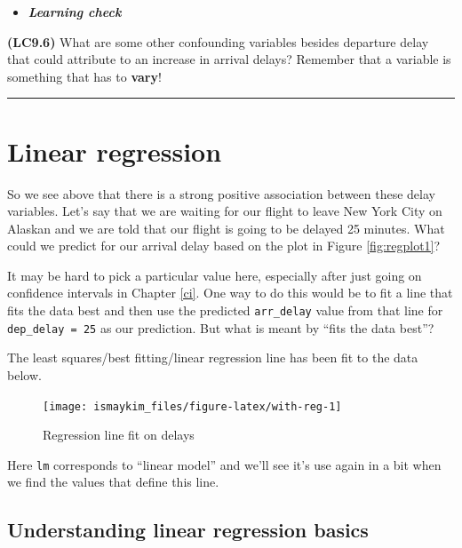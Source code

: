 \documentclass[]{tufte-book}
\let\oldrule=\rule
\renewcommand{\rule}[1]{\oldrule{\linewidth}}
\newenvironment{rmdblock}[1]
  {\begin{shaded*}
  \begin{itemize}
  \renewcommand{\labelitemi}{
    \raisebox{-.7\height}[0pt][0pt]{
    }
  }
  \item
  }
  {
  \end{itemize}
  \end{shaded*}
  }
\newenvironment{learncheck}
  {\begin{rmdblock}{warning}}
  {\end{rmdblock}}
\begin{document}
\begin{learncheck}
\textbf{\emph{Learning check}}
\end{learncheck}

\textbf{(LC9.6)} What are some other confounding variables besides
departure delay that could attribute to an increase in arrival delays?
Remember that a variable is something that has to \textbf{vary}!

\begin{center}\rule{0.5\linewidth}{\linethickness}\end{center}

\section{Linear regression}\label{linear-regression}

So we see above that there is a strong positive association between
these delay variables. Let's say that we are waiting for our flight to
leave New York City on Alaskan and we are told that our flight is going
to be delayed 25 minutes. What could we predict for our arrival delay
based on the plot in Figure \ref{fig:regplot1}?

It may be hard to pick a particular value here, especially after just
going on confidence intervals in Chapter \ref{ci}. One way to do this
would be to fit a line that fits the data best and then use the
predicted \texttt{arr\_delay} value from that line for
\texttt{dep\_delay\ =\ 25} as our prediction. But what is meant by
``fits the data best''?

The least squares/best fitting/linear regression line has been fit to
the data below.

\begin{figure}

{\centering \texttt{[image: ismaykim\_files/figure-latex/with-reg-1]} 

}

\caption[Regression line fit on delays]{Regression line fit on delays}\label{fig:with-reg}
\end{figure}

Here \texttt{lm} corresponds to ``linear model'' and we'll see it's use
again in a bit when we find the values that define this line.

\subsection{Understanding linear regression
basics}\label{understanding-linear-regression-basics}
\end{document}
